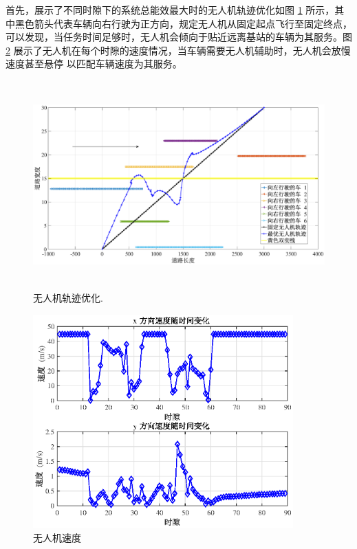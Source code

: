首先，展示了不同时隙下的系统总能效最大时的无人机轨迹优化如图 \ref{无人机轨迹优化} 所示，其中黑色箭头代表车辆向右行驶为正方向，规定无人机从固定起点飞行至固定终点，
可以发现，当任务时间足够时，无人机会倾向于贴近远离基站的车辆为其服务。图 \ref{无人机速度} 展示了无人机在每个时隙的速度情况，当车辆需要无人机辅助时，无人机会放慢速度甚至悬停
以匹配车辆速度为其服务。
\begin{figure}[H]
\centering
\includegraphics[width=16cm,height=8cm]{figures//chap4//小轨迹.eps}   %
\caption{无人机轨迹优化.}
\label{无人机轨迹优化}
\end{figure}
\begin{figure}[H]
\centering
\includegraphics[width=10cm]{figures//chap4//无人机速度.eps}
\caption{无人机速度}
\label{无人机速度}
\end{figure}


